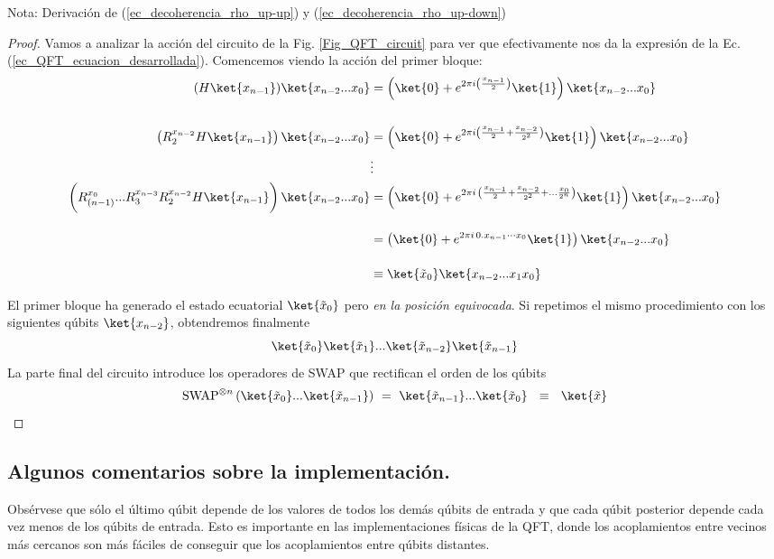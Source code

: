 \documentclass[a4paper,11pt]{book} %
\numberwithin{equation}{chapter}
\begin{document}
\begin{mybox_blue}{Nota: Derivación de (\ref{ec_decoherencia_rho_up-up}) y  (\ref{ec_decoherencia_rho_up-down})}
\begin{proof}
Vamos a analizar la acción del circuito de la Fig. \ref{Fig_QFT_circuit} para ver que efectivamente nos da la expresión de la Ec. (\ref{ec_QFT_ecuacion_desarrollada}). Comencemos viendo la acción del primer bloque:
	\begin{align*}
	(H\ket{x_{n-1}})\ket{x_{n-2}...x_0} & = \left( \ket{0} + e^{2\pi i \left(\frac{x_{n-1}}{2}\right)} \ket{1}\right) \ket{x_{n-2}...x_0}  \\ \rule{0mm}{10mm}
	\left(\rule{0mm}{3mm} R_{2}^{x_{n-2}}H\ket{x_{n-1}}\right) \ket{x_{n-2}...x_0}  & =  \left( \ket{0} + e^{2\pi i \left(\frac{x_{n-1}}{2} + \frac{x_{n-2}}{2^2}\right)} \ket{1}\right) \ket{x_{n-2}...x_0} \\ 
	& \vdots \\
	\left(\rule{0mm}{5mm}R_{{(n-1)}}^{x_{0}} ... R_{3} ^{x_{n-3}}  R_{2}^{x_{n-2}}H\ket{x_{n-1}}\right) \ket{x_{n-2}...x_0} & =  \left( \ket{0} + e^{2\pi i \, \left(\frac{x_{n-1}}{2} + \frac{x_{n-2}}{2^2}+\ldots \frac{x_0}{2^n}\right)}  \ket{1} \right) \ket{x_{n-2}...x_0} \\ \rule{0mm}{7mm}  
	& =  \left(\ket{0} + e^{2\pi i \, 0.x_{n-1}\cdots x_0}  \ket{1} \right) \ket{x_{n-2}...x_0} \\ \rule{0mm}{7mm}  
	& \equiv \ket{\tilde x_{0}} \ket{x_{n-2}... x_1x_0} 
	\end{align*}

	El primer bloque ha generado el estado ecuatorial $\ket{\tilde x_0}$ pero \textit{en la posición equivocada}. Si repetimos el mismo procedimiento con los siguientes qúbits $\ket{x_{n-2}}$, obtendremos finalmente
$$
 \ket{\tilde x_{0}}\ket{\tilde x_{1}}  ... \ket{\tilde{x}_{n-2}} \ket{\tilde x_{n-1}}
$$
La parte final del circuito introduce los operadores de SWAP que rectifican el orden de los qúbits 
$$
\hbox{SWAP}^{\otimes n} \,  (\ket{\tilde x_{0}}  ...  \ket{\tilde x_{n-1}} ) ~=~ 
\ket{\tilde x_{n-1}} ... \ket{\tilde{x}_{0}} ~~ \equiv ~~ \ket{\tilde x}
$$	
\end{proof}
 
		\subsection{Algunos comentarios sobre la implementación.}

Obsérvese que sólo el último qúbit depende de los valores de todos los demás qúbits de entrada y que cada qúbit posterior depende cada vez menos de los qúbits de entrada. Esto es importante en las implementaciones físicas de la QFT, donde los acoplamientos entre vecinos más cercanos son más fáciles de conseguir que los acoplamientos entre qúbits distantes.


\end{mybox_blue}
\end{document}

